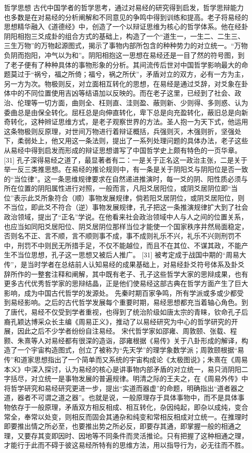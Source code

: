 \documentclass[a4paper,12pt,UTF8,twoside]{ctexbook}
\begin{document}
哲学思想
古代中国学者的哲学思考，通过对易经的研究得到启发，哲学思辩能力也多数是在对易经的分析阐解和不同意见的争鸣中得到训练和提高。老子将易经的思想精华融入《道德经》中，创造了一个以辩证思维为核心的哲学体系。他在经卦阴阳相抱三爻成卦的组合方式的基础上，构造了一个“道生一，一生二、二生三、三生万物”的万物起源图式，揭示了事物内部所包含的种种势力的对立统一。“万物负阴而抱阳，冲气以为和”。阴阳相抱这一思想在易经还是一目了然的符号图，到了老子便有了种种具体的事物形象的分析。其间流传后世对中国哲学影响最大的命题莫过于“祸兮，福之所倚；福兮，祸之所伏”，矛盾对立的双方，必有一方为主，另一方为次。物极则反，对立面相互转化的思想，在易经是通过爻辞，对爻象在卦体中的不同位置使用吉凶等结语加以反映的。而在老子这里，已经到了社会、政治、伦理等一切方面，曲则全、枉则直、洼则盈、蔽则新、少则得、多则惑、认为委曲总是由保全转化。屈枉总是向伸直转化，卑下总是向充盈转化，蔽旧总是向新奇转化，这种辫证思维方式，是老子观察世界的方法。圣人抱一为天下式，他运用这条物极则反原理，对世间万物进行着辩证概括，兵强则灭，木强则折，坚强处下，柔弱处上，他又用这一条法则，提出了一系列处理问题的具体办法，老子这些从易经中得到启发而形成的辩证思想谱写了中国哲学史上颇有特色的一页华章。 [31]
孔子深得易经之道了，最显著者有二：一是关于正名这一政治主张，二是关于举一反三类推思想。在易经的推论规则中，有一条是关于阴阳爻与阴阳位是否一致的“当位律”。这一条思维规律要求在自然递进推演时，每一爻的阴、阳性质必须与所在位置的阴阳属性进行对照，一般而言，凡阳爻居阳位，或阴爻居阴位即“当位”表示此爻所象符合（顺）事物发展规律，倘若阳爻居阴位，或阴爻居阳位，则不当位，即此爻不符合（逆）事物发展规律，孔子把这一条推演规律扩大到了社会政治领域，提出了“正名”学说。在他看来社会政治领域中人与人之间的位置关系，也应当如同阳爻居阳位、阴爻居阴位那样当位才能使一个国家秩序井然局面稳定，否则名不正、言不顺，言不顺则事不成，事不成则礼乐不兴，礼乐不兴则刑罚不中，刑罚不中则民无所措手足，不仅不能越位，而且不在其位、不谋其政，不能产生不当位思想，孔子这一思想又被后人推广。 [31]
被考定成于战国中期的“周易大传”，是当时学者在总结前人认知易经的成果基础上，对易经卦爻符号体系及卦爻辞所作的一整套注释和阐解，其中既有老子、孔子这些哲学大家的思辩成果，也有更多古代优秀哲学家的思辩结晶，正是他们使易经这部古典在哲学方面产生了巨大影响，成为中国古代哲学的发源处。
先秦时期百家争鸣，所有学派或多或少都受到易经影响。之后的古代哲学发展每个重要时期，易经思想都充当着轴心角色。到了唐代，易经不仅受到学者重视，也得到了统治阶级如唐太宗的青睐，钦命孔子后裔孔颖达博采众长主编《周易正义》，推动了以易经研究为中心的哲学研究的开展，因此之后不少学者纷纷自注易经。
宋代哲学家如邵雍、周敦颐、张载、程颢、朱熹等人对易经都有很深的造诣，邵雍根据《易传》关于八卦形成的解译，构造了一个宇宙构造图式，创立了被称为“先天学”的理学象数学派；周敦颐根据“易传”和道家思想指出了一个简单而又系统的宇宙构成论《太极图说》；朱熹在《周易本义》中深入探讨，认为易经的核心是讲事物内部矛盾的对立统一，易只消阴阳二字括尽，对立统一是事物发展的普遍规律。明清之际的王夫之，在《周易外传》中将哲学研究和易经研究更进一步，提出“实道而器虚”的命题，明确指出“道者器之道，器者不可谓之道之器”。也就是说，一般原理存于具体事物中，而不是具体事物依存于一般原理，矛盾双方相反相成、相互转化，杂因纯起，即杂以成纯，变合常全，奉常以处变，则相反而固会其通杂和纯变和常相反相成对立统一。在推理时即要推出情之所必至，也要推出势之所必反，即要存其通，即掌握一般的相通之理，又要存其变即因时、因地等不同条件而灵活推论。只有把握了这种相通之理，才能行于此而不碍于彼这易经所特有的思维方法，用以指导行为，必无往而不胜。
\end{document}
